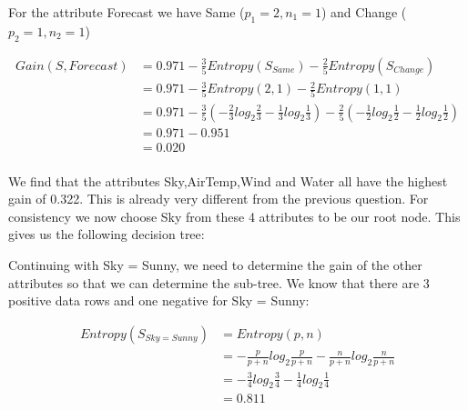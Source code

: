 \documentclass[10pt,a4paper]{article}
\begin{document}
{{{{{{{{{{For the attribute Forecast we have Same ($p_1=2,n_1=1$) and Change ($p_2=1,n_2=1$)

\begin{equation}
\begin{split}
Gain(S,Forecast) &= 0.971 - \frac{3}{5} Entropy(S_{Same} ) - \frac{2}{5}Entropy(S_{Change}) \\
          &= 0.971 - \frac{3}{5} Entropy(2,1) - \frac{2}{5}Entropy(1,1) \\
          &= 0.971 -\frac{3}{5} ( -\frac{2}{3} log_2\frac{2}{3} -\frac{1}{3} log_2\frac{1}{3} ) - \frac{2}{5}(-\frac{1}{2} log_2\frac{1}{2} - \frac{1}{2}log_2\frac{1}{2} ) \\
          &= 0.971 - 0.951\\
          &= 0.020 \\
\end{split}
\end{equation}

We find that the attributes Sky,AirTemp,Wind and Water all have the highest gain of 0.322. This is already very different from the previous question. For consistency we now choose Sky from these 4 attributes to be our root node. This gives us the following decision tree:


Continuing with Sky = Sunny, we need to determine the gain of the other attributes so that we can determine the sub-tree. We know that there are 3 positive data rows and one negative for Sky = Sunny:

\begin{equation}
\begin{split}
Entropy(S_{Sky=Sunny}) &= Entropy(p,n) \\
                       &= -\frac{p}{p+n}log_2\frac{p}{p+n} - \frac{n}{p+n}log_2\frac{n}{p+n}  \\
                       &= -\frac{3}{4} log_2\frac{3}{4} -\frac{1}{4} log_2\frac{1}{4} \\
                       &= 0.811   \\
\end{split}
\end{equation}

}}}}}}}}}}
\end{document}
